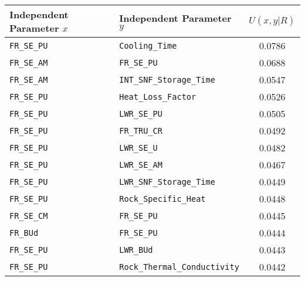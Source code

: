 \begin{center}
\begin{tabular}{|l|l|c|}
\hline
\textbf{Independent Parameter $x$}&\textbf{Independent Parameter $y$}&\textbf{$U(x,y|R)$}\\
\hline
\texttt{FR\_SE\_PU}&\texttt{Cooling\_Time}               & 0.0786\\
\hline
\texttt{FR\_SE\_AM}&\texttt{FR\_SE\_PU}                  & 0.0688\\
\hline
\texttt{FR\_SE\_AM}&\texttt{INT\_SNF\_Storage\_Time}     & 0.0547\\
\hline
\texttt{FR\_SE\_PU}&\texttt{Heat\_Loss\_Factor}          & 0.0526\\
\hline
\texttt{FR\_SE\_PU}&\texttt{LWR\_SE\_PU}                 & 0.0505\\
\hline
\texttt{FR\_SE\_PU}&\texttt{FR\_TRU\_CR}                 & 0.0492\\
\hline
\texttt{FR\_SE\_PU}&\texttt{LWR\_SE\_U}                  & 0.0482\\
\hline
\texttt{FR\_SE\_PU}&\texttt{LWR\_SE\_AM}                 & 0.0467\\
\hline
\texttt{FR\_SE\_PU}&\texttt{LWR\_SNF\_Storage\_Time}     & 0.0449\\
\hline
\texttt{FR\_SE\_PU}&\texttt{Rock\_Specific\_Heat}        & 0.0448\\
\hline
\texttt{FR\_SE\_CM}&\texttt{FR\_SE\_PU}                  & 0.0445\\
\hline
\texttt{FR\_BUd}&\texttt{FR\_SE\_PU}                     & 0.0444\\
\hline
\texttt{FR\_SE\_PU}&\texttt{LWR\_BUd}                    & 0.0443\\
\hline
\texttt{FR\_SE\_PU}&\texttt{Rock\_Thermal\_Conductivity} & 0.0442\\
\hline
\end{tabular}
\end{center}

\begin{comment}
\texttt{Ambient\_Temp}&\texttt{FR\_SE\_PU}&0.0438545730185\\
\hline
\texttt{FR\_SE\_PU}&\texttt{LWR\_SE\_CS}&0.0438481227943\\
\hline
\texttt{FR\_SE\_PU}&\texttt{LWR\_SE\_SR}&0.0436468041277\\
\hline
\texttt{Drift\_Space}&\texttt{FR\_SE\_PU}&0.0434940997611\\
\hline
\texttt{FR\_SE\_PU}&\texttt{FR\_SNF\_Storage\_Time}&0.0433708807088\\
\hline
\texttt{FR\_SE\_CS}&\texttt{FR\_SE\_PU}&0.0432348364514\\
\hline
\texttt{FR\_SE\_PU}&\texttt{Rock\_Density}&0.043203201625\\
\hline
\texttt{FR\_SE\_PU}&\texttt{LWR\_SE\_CM}&0.0431931733916\\
\hline
\end{comment}

